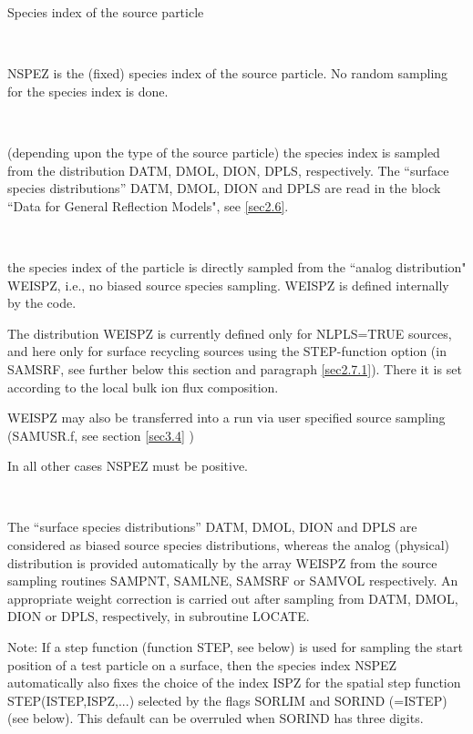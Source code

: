 \begin{list}{ }{}
\item[{\bf NSPEZ }]
Species index of the source particle
\begin{list}{ }{}
\item[{1 $\le$ NSPEZ $\le$  NATMI, NMOLI, NIONI, NPLSI }]~

NSPEZ is the (fixed) species index of the source particle.
No random sampling for the species index is done.
\item[{NSPEZ $>$  NATMI, NMOLI, NIONI, NPLSI }]~

(depending upon the type of the source particle) the species index
is sampled from the distribution DATM, DMOL, DION, DPLS,
respectively.  The ``surface species distributions'' DATM, DMOL,
DION and DPLS are read in the block ``Data for General Reflection
Models", see \ref{sec2.6}.

\item[{NSPEZ $ = $ 0 }]~

the species index of the particle is directly sampled from the
``analog distribution" WEISPZ, i.e., no biased source species
sampling. WEISPZ is defined internally by the code.

The distribution WEISPZ is currently defined only for NLPLS=TRUE
sources, and here only for surface recycling sources using the STEP-function option (in SAMSRF, see further below
this section and paragraph \ref{sec2.7.1}). There it is set according to the local bulk ion flux
composition.

WEISPZ may also be transferred into a run via
user specified source sampling (SAMUSR.f, see section \ref{sec3.4} )


In all other cases NSPEZ must be positive.


\item[{NSPEZ $<$  0 }]~

The ``surface species distributions'' DATM, DMOL, DION and DPLS are
considered as biased source species distributions, whereas the
analog (physical) distribution is provided automatically by the
array WEISPZ from the source sampling routines SAMPNT, SAMLNE,
SAMSRF or SAMVOL respectively. An appropriate weight correction is
carried out after sampling from DATM, DMOL, DION or DPLS,
respectively, in subroutine LOCATE.

\end{list}

Note: If a step function (function STEP, see below) is used for
sampling the start position of a test particle on a surface, then
the species index NSPEZ automatically also fixes the choice of the
index ISPZ for the spatial step function STEP(ISTEP,ISPZ,...)
selected by the flags SORLIM and SORIND (=ISTEP) (see below). This
default can be overruled  when SORIND has three digits.



\end{list}

